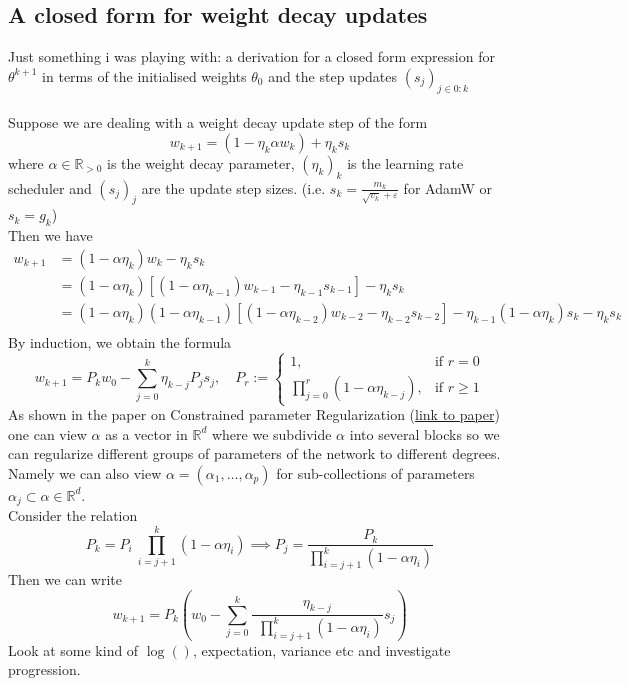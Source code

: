 \documentclass[12pt]{book}
\newcommand{\R}{\mathbb{R}}
\begin{document}
\subsection*{A closed form for weight decay updates}
Just something i was playing with: a derivation for a closed form expression for  $\theta^{k+1}$ in terms of the initialised weights $\theta_0$ and the step updates $(s_{j})_{j \in 0: k} $
\\\\
Suppose we are dealing with a weight decay update step of the form 
\[
w_{k+1}  = (1-\eta_k \alpha w_k) + \eta_k s_k 
\] 
where $\alpha\in\R_{>0}$ is the weight decay parameter, $(\eta_{k})_{k} $ is the learning rate scheduler and  $(s_{j})_{j} $ are the update step sizes. (i.e. $s_k = \frac{m_k}{\sqrt{v_k} + \varepsilon }$ for AdamW or $s_k = g_k$)
\\
Then we have 
\begin{align*}
	w_{k+1} &= (1-\alpha\eta_k )w_{k} -\eta_k s_k\\
&= (1-\alpha\eta_k) [(1-\alpha\eta_{k-1})w_{k-1} - \eta_{k-1}s_{k-1}] -\eta_ks_k\\
&= (1-\alpha\eta_k)(1-\alpha\eta_{k-1})[(1-\alpha\eta_{k-2})w_{k-2} - \eta_{k-2}s_{k-2}] - \eta_{k-1}(1-\alpha\eta_k)s_k - \eta_k s_k\\
\end{align*}
By induction, we obtain the formula
\[
w_{k+1} = P_k w_0 - \sum_{j=0}^{k} {\eta_{k-j}P_js_j}, \quad P_r := \begin{cases}
	1, & \text{if $r = 0$}\\
	\displaystyle\prod_{j=0}^{r} (1-\alpha\eta_{k-j} ), & \text{if $r\ge 1$}
\end{cases}
\] 
As shown in the paper on Constrained parameter Regularization (\href{https://openreview.net/pdf?id=rCXTkIhkbF}{link to paper}) one can view $\alpha$ as a vector in $\R^{d}$ where we subdivide $\alpha$ into several blocks so we can regularize different groups of parameters of the network to different degrees. Namely we can also view $\alpha = (\alpha_1, \ldots, \alpha_p)$ for sub-collections of parameters $\alpha_j \subset \alpha \in \R^{d}$. 
\\
Consider the relation 
\[
P_k = P_i \  \displaystyle\prod_{i=j+1}^{k} ( 1 - \alpha\eta_i) \implies P_j = \frac{P_k}{\prod_{i=j+1}^{k} (1-\alpha\eta_i)}
\] 
Then we can write 
\[
	w_{k+1} = P_k\left(w_0 - \sum_{j=0}^{k} {\frac{\eta_{k-j}}{\ \ \prod_{i=j+1}^{k} (1-\alpha\eta_i)}s_j}\right)
\] 
Look at some kind of $\log()$, expectation, variance etc and investigate progression. 
\end{document}
